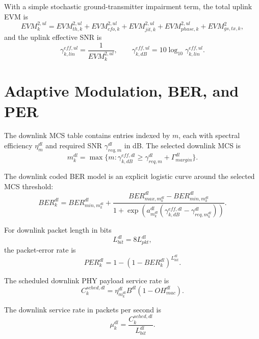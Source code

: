 \documentclass[11pt]{article}
\begin{document}
With a simple stochastic ground-transmitter impairment term, the total uplink EVM is
\begin{equation}
  EVM^{2,ul}_k
  =
  EVM^{2,ul}_{th,k}
  + EVM^{2,ul}_{cfo,k}
  + EVM^{2,ul}_{jit,k}
  + EVM^{2,ul}_{phase,k}
  + EVM^{2}_{gs,tx,k},
\end{equation}
and the uplink effective SNR is
\begin{equation}
  \gamma^{eff,ul}_{k,lin} = \frac{1}{EVM^{2,ul}_k},
  \qquad
  \gamma^{eff,ul}_{k,dB} = 10\log_{10}\gamma^{eff,ul}_{k,lin}.
\end{equation}

\section{Adaptive Modulation, BER, and PER}

The downlink MCS table contains entries indexed by $m$, each with spectral efficiency
$\eta^{dl}_m$ and required SNR $\gamma^{dl}_{req,m}$ in dB.
The selected downlink MCS is
\begin{equation}
  m^{dl}_k
  =
  \max\{m : \gamma^{eff,dl}_{k,dB} \ge \gamma^{dl}_{req,m} + \Gamma^{dl}_{margin}\}.
\end{equation}

The downlink coded BER model is an explicit logistic curve around the selected MCS threshold:
\begin{equation}
  BER^{dl}_k
  =
  BER^{dl}_{min,m^{dl}_k}
  +
  \frac{BER^{dl}_{max,m^{dl}_k} - BER^{dl}_{min,m^{dl}_k}}
       {1 + \exp\left(a^{dl}_{m^{dl}_k}\left(\gamma^{eff,dl}_{k,dB} - \gamma^{dl}_{req,m^{dl}_k}\right)\right)}.
\end{equation}

For downlink packet length in bits
\begin{equation}
  L^{dl}_{bit} = 8L^{dl}_{pkt},
\end{equation}
the packet-error rate is
\begin{equation}
  PER^{dl}_k = 1 - (1 - BER^{dl}_k)^{L^{dl}_{bit}}.
\end{equation}

The scheduled downlink PHY payload service rate is
\begin{equation}
  C^{sched,dl}_k = \eta^{dl}_{m^{dl}_k} B^{dl} (1 - OH^{dl}_{mac}).
\end{equation}

The downlink service rate in packets per second is
\begin{equation}
  \mu^{dl}_k = \frac{C^{sched,dl}_k}{L^{dl}_{bit}}.
\end{equation}
\end{document}
